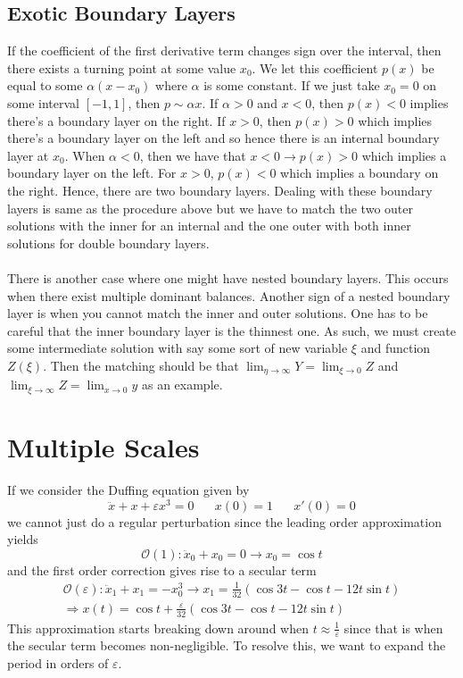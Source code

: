 \documentclass{article}
\newcommand{\twen}{\hspace{20pt}}
\begin{document}
\subsection{Exotic Boundary Layers}
If the coefficient of the first derivative term changes sign over the interval, then there exists a turning point at some value $x_0$. We let this coefficient $p(x)$ be equal to some $\alpha (x-x_0)$ where $\alpha$ is some constant. If we just take $x_0=0$ on some interval $[-1,1]$, then $p\sim \alpha x$. If $\alpha >0$ and $x<0$, then $p(x)<0$ implies there's a boundary layer on the right. If $x>0$, then $p(x)>0$ which implies there's a boundary layer on the left and so hence there is an internal boundary layer at $x_0$. When $\alpha <0$, then we have that $x<0\to p(x)>0$ which implies a boundary layer on the left. For $x>0$, $p(x)<0$ which implies a boundary on the right. Hence, there are two boundary layers. Dealing with these boundary layers is same as the procedure above but we have to match the two outer solutions with the inner for an internal and the one outer with both inner solutions for double boundary layers. \\\\There is another case where one might have nested boundary layers. This occurs when there exist multiple dominant balances. Another sign of a nested boundary layer is when you cannot match the inner and outer solutions. One has to be careful that the inner boundary layer is the thinnest one. As such, we must create some intermediate solution with say some sort of new variable $\xi$ and function $Z(\xi)$. Then the matching should be that $\displaystyle{\lim_{\eta \to \infty}Y = \lim_{\xi \to 0}Z}$ and $\displaystyle{\lim_{\xi \to \infty} Z = \lim_{x\to 0} y}$ as an example. 
\section{Multiple Scales}
If we consider the Duffing equation given by 
\begin{equation*}
    \ddot{x} +x+\varepsilon x^3 =0 \twen x(0)=1 \twen x'(0)=0
\end{equation*}
we cannot just do a regular perturbation since the leading order approximation yields 
\begin{equation*}
    \mathcal{O}(1) : \ddot x_0 + x_0 = 0\to x_0=\cos t
\end{equation*}
and the first order correction gives rise to a secular term 
\begin{equation*}
    \begin{split}
        \mathcal{O}(\varepsilon) : \ddot x_1 + x_1 = -x_0^3 \to x_1 = \frac{1}{32}\left(\cos 3t -\cos t-12 t \sin t \right) \\
        \Rightarrow x(t) = \cos t + \frac{\varepsilon}{32}\left(\cos 3t -\cos t-12 t \sin t \right)
    \end{split}
\end{equation*}
This approximation starts breaking down around when $t\approx \frac{1}{\varepsilon}$ since that is when the secular term becomes non-negligible. To resolve this, we want to expand the period in orders of $\varepsilon$. 
\end{document}
